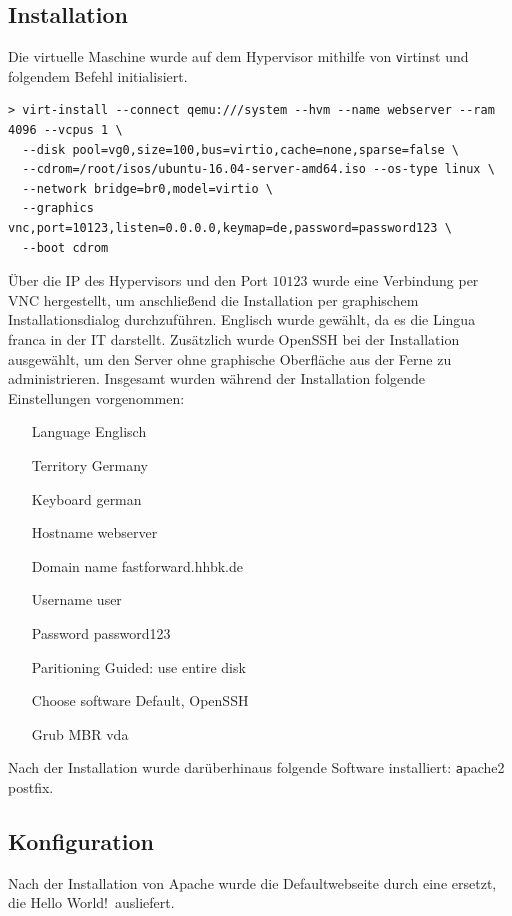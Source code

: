 \subsection{Installation}

Die virtuelle Maschine wurde auf dem Hypervisor mithilfe von {\texttt virtinst} und folgendem Befehl initialisiert.

\begin{lstlisting}[numbers=none]
> virt-install --connect qemu:///system --hvm --name webserver --ram 4096 --vcpus 1 \
  --disk pool=vg0,size=100,bus=virtio,cache=none,sparse=false \
  --cdrom=/root/isos/ubuntu-16.04-server-amd64.iso --os-type linux \
  --network bridge=br0,model=virtio \
  --graphics vnc,port=10123,listen=0.0.0.0,keymap=de,password=password123 \
  --boot cdrom
\end{lstlisting}

Über die IP des Hypervisors und den Port $10123$ wurde eine Verbindung per VNC hergestellt, um anschließend die Installation per graphischem Installationsdialog durchzuführen. Englisch wurde gewählt, da es die Lingua franca in der IT darstellt. Zusätzlich wurde OpenSSH bei der Installation ausgewählt, um den Server ohne graphische Oberfläche aus der Ferne zu administrieren. Insgesamt wurden während der Installation folgende Einstellungen vorgenommen:
\begin{itemize}
	\item[Language] Englisch
	\item[Territory] Germany
	\item[Keyboard] german
	\item[Hostname] webserver
	\item[Domain name] fastforward.hhbk.de
	\item[Username] user
	\item[Password] password123
	\item[Paritioning] Guided: use entire disk
	\item[Choose software] Default, OpenSSH
	\item[Grub MBR] vda
\end{itemize}

Nach der Installation wurde darüberhinaus folgende Software installiert: {\texttt apache2 postfix}.

\subsection{Konfiguration}

Nach der Installation von Apache wurde die Defaultwebseite durch eine ersetzt, die \ql Hello World!\qr\ ausliefert.

